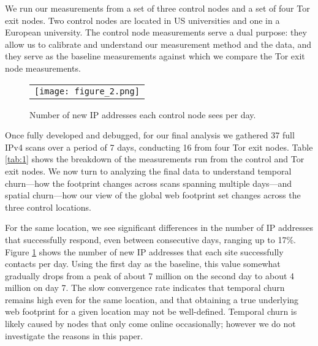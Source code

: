 \documentclass[12pt]{spieman}
\begin{document}
\begin{spacing}{2}
We run our measurements from a set of three control nodes and a set of four Tor exit nodes. Two control nodes are located in US universities and one in a European university. The control node measurements serve a dual purpose: they allow us to calibrate and understand our measurement method and the data, and they serve as the baseline measurements against which we compare the Tor exit node measurements.

\begin{figure}
\begin{center}
\begin{tabular}{c}
\texttt{[image: figure\_2.png]}
\end{tabular}
\end{center}
\caption 
{ \label{fig:2}
Number of new IP addresses each control node sees per day. } 
\end{figure} 

Once fully developed and debugged, for our final analysis we gathered 37 full IPv4 scans over a period of 7 days, conducting 16 from four Tor exit nodes. Table \ref{tab:1}  shows the breakdown of the measurements run from the control and Tor exit nodes. We now turn to analyzing the final data to understand temporal churn—how the footprint changes across scans spanning multiple days—and spatial churn—how our view of the global web footprint set changes across the three control locations.

For the same location, we see significant differences in the number of IP addresses that successfully respond, even between consecutive days, ranging up to 17\%. Figure \ref{fig:2} shows the number of new IP addresses that each site successfully contacts per day. Using the first day as the baseline, this value somewhat gradually drops from a peak of about 7 million on the second day to about 4 million on day 7. The slow convergence rate indicates that temporal churn remains high even for the same location, and that obtaining a true underlying web footprint for a given location may not be well-defined. Temporal churn is likely caused by nodes that only come online occasionally; however we do not investigate the reasons in this paper.


\end{spacing}
\end{document}
